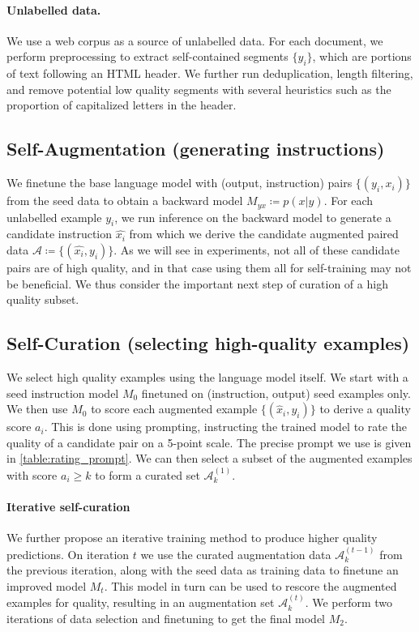 \paragraph{Unlabelled data.} We use a web corpus as a source of unlabelled data.
For each document, we perform preprocessing to extract self-contained segments $\{ y_{i}\}$, which are portions of text following an HTML header. We further run deduplication, length filtering, and remove potential low quality segments with several heuristics such as the proportion of capitalized letters in the header. 


\subsection{Self-Augmentation (generating instructions)}  \label{sec:self-augment}

We finetune the base language model with (output, instruction) pairs $\{(y_{i}, x_{i})\}$ from the seed data to obtain a backward model $M_{yx}\coloneqq p(x|y)$. For each unlabelled example $y_i$, we run inference on the backward model to generate a candidate instruction $\hat{x_{i}}$ from which we  derive the  candidate augmented paired data $\mathcal{A} \coloneqq \{(\hat{x_{i}}, y_{i})\}$.
As we will see in experiments, not all of these candidate pairs are of high quality, and in that case using them all for self-training may not be beneficial. We thus consider the important next step of curation of a high quality subset.


\subsection{Self-Curation (selecting high-quality examples)} 

We select high quality examples using the language model itself. 
We start with a seed instruction model $M_{0}$ finetuned on (instruction, output) seed examples only. We then use $M_{0}$ to score each augmented example $\{(\hat{x}_{i}, y_{i})\}$ to derive a quality score $a_i$.  This is done using prompting, instructing the trained model to rate the quality of a candidate pair on a 5-point scale. The precise prompt we use is given in \autoref{table:rating_prompt}.
We can then select a subset of the augmented examples with score $a_i \ge k$ to form a curated set $\mathcal{A}_k^{(1)}$.

\paragraph{Iterative self-curation} 
We further propose an iterative training method to produce higher quality predictions.
On iteration $t$ we use the curated augmentation data $\mathcal{A}_k^{(t-1)}$ from the previous iteration, along with the seed data as training data to finetune an improved model $M_t$. This model in turn can be used to rescore the augmented examples for quality, resulting in an augmentation set $\mathcal{A}_k^{(t)}$. We perform two iterations of data selection and finetuning to get the final model $M_2$. 

